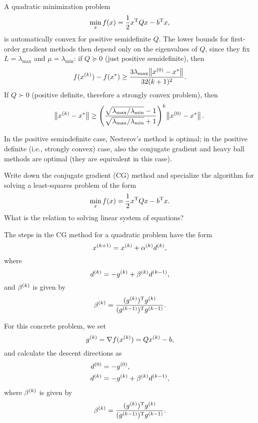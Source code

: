 \documentclass{article}
\begin{document}
A quadratic minimization problem
\begin{equation*}
  \min_x f(x) = \frac{1}{2} \T{x} Q x - \T{b}x,
\end{equation*}
is automatically convex for positive semidefinite \(Q\).  The lower bounds for first-order gradient
methods then depend only on the eigenvalues of \(Q\), since they fix \(L = \lambda_{\text{max}}\)
and \(\mu = \lambda_{\text{min}}\): if \(Q \succeq 0\) (just positive semidefinite), then
\begin{equation*}
  f(\kth{x}) - f(x^*) \geq \frac{3\lambda_{\text{max}} \enVert[1]{\kth[0]{x} - x^*}}{32(k+1)^2}.
\end{equation*}
If \(Q \succ 0\) (positive definite, therefore a strongly convex problem), then
\begin{equation*}
  \enVert[1]{\kth{x} - x^*}
  \geq \left( \frac{\sqrt{\lambda_{\text{max}}/\lambda_{\text{min}}} - 1}{
      \sqrt{\lambda_{\text{max}}/\lambda_{\text{min}}} + 1} \right)^k \enVert[1]{\kth[0]{x} - x^*}.
\end{equation*}

In the positive semindefinite case, Nesterov's method is optimal; in the positive definite (i.e.,
strongly convex) case, also the conjugate gradient and heavy ball methods are optimal (they are
equivalent in this case).

\begin{question}
  Write down the conjugate gradient (CG) method and specialize the algorithm for solving a
  least-squares problem of the form
  \[
    \min_x f(x) = \frac{1}{2} \T{x} Q x - \T{b} x.
  \]
  What is the relation to solving linear system of equations?
\end{question}

The steps in the CG method for a quadratic problem have the form
\begin{equation*}
  \kth[k+1]{x} = \kth{x} + \kth{\alpha}\kth{d},
\end{equation*}
where
\begin{equation*}
  \kth{d} = -\kth{g} + \kth{\beta}\kth[k-1]{d},
\end{equation*}
and \(\kth{\beta}\) is given by
\begin{equation*}
  \kth{\beta} = \frac{\T{(\kth{g})}\kth{g}}{\T{(\kth[k-1]{g})}\kth[k-1]{g}}.
\end{equation*}

For this concrete problem, we set
\begin{equation*}
  \kth{g} = \nabla f(\kth{x}) = Q \kth{x} - b,
\end{equation*}
and calculate the descent directions as
\begin{align*}
  \kth[0]{d} &= -\kth[0]{g}, \\
  \kth[k]{d} &= -\kth{g} + \kth{\beta}\kth[k-1]{d},
\end{align*}
where \(\kth{\beta}\) is given by
\begin{equation*}
  \kth{\beta} = \frac{\T{(\kth{g})}\kth{g}}{\T{(\kth[k-1]{g})}\kth[k-1]{g}}.
\end{equation*}
\end{document}
